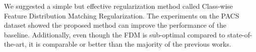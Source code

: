 We suggested a simple but effective regularization method called Class-wise Feature Distribution Matching Regularization. The experiments on the PACS dataset showed the proposed method can improve the performance of the baseline. Additionally, even though the FDM is sub-optimal compared to state-of-the-art, it is comparable or better than the majority of the previous works.